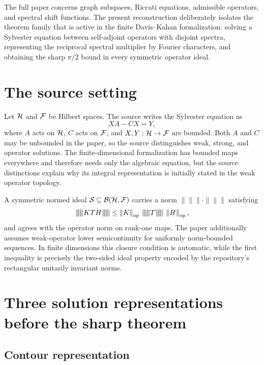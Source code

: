 The full paper concerns graph subspaces, Riccati equations, admissible operators, and spectral shift functions. The present reconstruction deliberately isolates the theorem family that is active in the finite Davis--Kahan formalization: solving a Sylvester equation between self-adjoint operators with disjoint spectra, representing the reciprocal spectral multiplier by Fourier characters, and obtaining the sharp $\pi/2$ bound in every symmetric operator ideal.

\section{The source setting}


Let $\mathcal{H}$ and $\mathcal{F}$ be Hilbert spaces. The source writes the Sylvester equation as
\begin{equation}
  XA-CX=Y,
  \tag{AMM-Syl}\label{eq:amm-syl}
\end{equation}
where $A$ acts on $\mathcal{H}$, $C$ acts on $\mathcal{F}$, and $X,Y:\mathcal{H}\to\mathcal{F}$ are bounded. Both $A$ and $C$ may be unbounded in the paper, so the source distinguishes weak, strong, and operator solutions. The finite-dimensional formalization has bounded maps everywhere and therefore needs only the algebraic equation, but the source distinctions explain why its integral representation is initially stated in the weak operator topology.

A symmetric normed ideal $\mathcal S\subseteq\mathcal B(\mathcal{H},\mathcal{F})$ carries a norm $\lVert\!\lVert\!\lVert\cdot\rVert\!\rVert\!\rVert$ satisfying
\[
  \lVert\!\lVert\!\lVert KTH\rVert\!\rVert\!\rVert
  \le \norm{K}_{\op}\,
      \lVert\!\lVert\!\lVert T\rVert\!\rVert\!\rVert\,
      \norm{H}_{\op},
\]
and agrees with the operator norm on rank-one maps. The paper additionally assumes weak-operator lower semicontinuity for uniformly norm-bounded sequences. In finite dimensions this closure condition is automatic, while the first inequality is precisely the two-sided ideal property encoded by the repository's rectangular unitarily invariant norms.

\section{Three solution representations before the sharp theorem}

\subsection{Contour representation}

